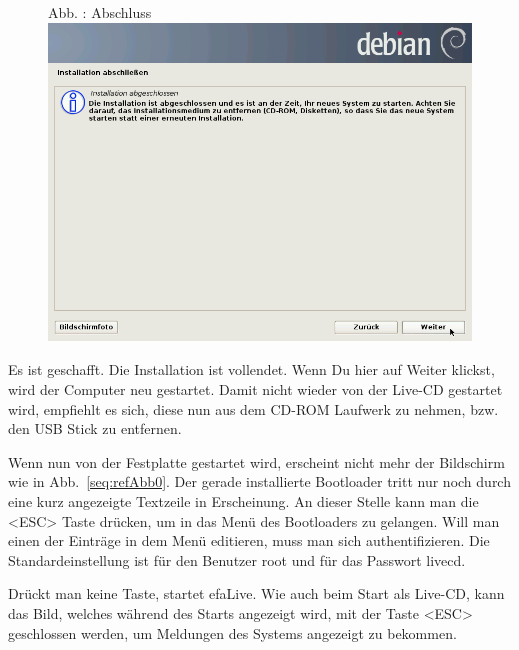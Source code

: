 \documentclass[a4paper,12pt,twoside]{article}
\newcounter{Abb}
\renewcommand\theAbb{\arabic{Abb}}
\begin{document}
\bigskip


\bigskip



\begin{figure}
\centering
\begin{minipage}{11.261cm}
Abb. \stepcounter{Abb}{\theAbb}: Abschluss
\includegraphics[width=11.261cm,height=8.446cm]{efaLivede-img/efaLivede-img18.png}\end{minipage}
\end{figure}
Es ist geschafft. Die Installation ist vollendet. Wenn Du hier auf
{\textquotedbl}Weiter{\textquotedbl} klickst, wird der Computer neu
gestartet. Damit nicht wieder von der Live-CD gestartet wird, empfiehlt
es sich, diese nun aus dem CD-ROM Laufwerk zu nehmen, bzw. den USB
Stick zu entfernen.


\bigskip

Wenn nun von der Festplatte gestartet wird, erscheint nicht mehr der
Bildschirm wie in Abb.~\ref{seq:refAbb0}. Der gerade installierte
Bootloader tritt nur noch durch eine kurz angezeigte Textzeile in
Erscheinung. An dieser Stelle kann man die {\textless}ESC{\textgreater}
Taste drücken, um in das Menü des Bootloaders zu gelangen. Will man
einen der Einträge in dem Menü editieren, muss man sich
authentifizieren. Die Standardeinstellung ist für den Benutzer
{\textquotedbl}root{\textquotedbl} und für das Passwort
{\textquotedbl}livecd{\textquotedbl}. 

Drückt man keine Taste, startet efaLive. Wie auch beim Start als
Live-CD, kann das Bild, welches während des Starts angezeigt wird, mit
der Taste {\textless}ESC{\textgreater} geschlossen werden, um Meldungen
des Systems angezeigt zu bekommen.


\bigskip
\end{document}
